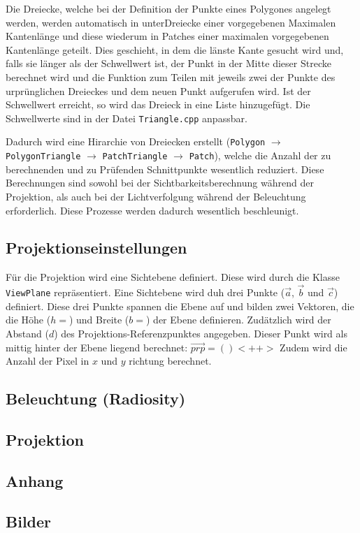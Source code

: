\documentclass[final,a4paper,11pt,notitlepage,halfparskip]{scrreprt}
\begin{document}
Die Dreiecke, welche bei der Definition der Punkte eines Polygones angelegt
werden, werden automatisch in unterDreiecke einer vorgegebenen Maximalen
Kantenlänge und diese wiederum in Patches einer maximalen vorgegebenen
Kantenlänge geteilt. Dies geschieht, in dem die länste Kante gesucht wird und,
falls sie länger als der Schwellwert ist, der Punkt in der Mitte dieser Strecke
berechnet wird und die Funktion zum Teilen mit jeweils zwei der Punkte des
urprünglichen Dreieckes und dem neuen Punkt aufgerufen wird. Ist der Schwellwert
erreicht, so wird das Dreieck in eine Liste hinzugefügt. Die Schwellwerte sind
in der Datei \texttt{Triangle.cpp} anpassbar.

Dadurch wird eine Hirarchie von Dreiecken erstellt (\texttt{Polygon} 
$\rightarrow$ \texttt{PolygonTriangle} $\rightarrow$ \texttt{PatchTriangle} 
$\rightarrow$ \texttt{Patch}), welche die Anzahl der zu berechnenden und zu
Prüfenden Schnittpunkte wesentlich reduziert. Diese Berechnungen sind sowohl bei
der Sichtbarkeitsberechnung während der Projektion, als auch bei der
Lichtverfolgung während der Beleuchtung erforderlich. Diese Prozesse werden
dadurch wesentlich beschleunigt.

\section{Projektionseinstellungen}
Für die Projektion wird eine Sichtebene definiert. Diese wird durch die Klasse
\texttt{ViewPlane} repräsentiert. Eine Sichtebene wird duh drei Punkte
($\vec{a}$, $\vec{b}$ und $\vec{c}$) definiert. Diese drei Punkte spannen die 
Ebene auf und bilden zwei Vektoren, die die Höhe ($h = $) und Breite ($b = $) der 
Ebene definieren. Zudätzlich wird der Abstand ($d$) des 
Projektions-Referenzpunktes angegeben. Dieser Punkt wird als mittig hinter der
Ebene liegend berechnet:
$\vec{prp} = ()<++>$
Zudem wird die Anzahl der Pixel in $x$ und $y$ richtung
berechnet.

\section{Beleuchtung (Radiosity)}

\section{Projektion}

\begin{appendix}
\chapter{Anhang}
\section{Bilder}
\end{appendix}
\end{document}
